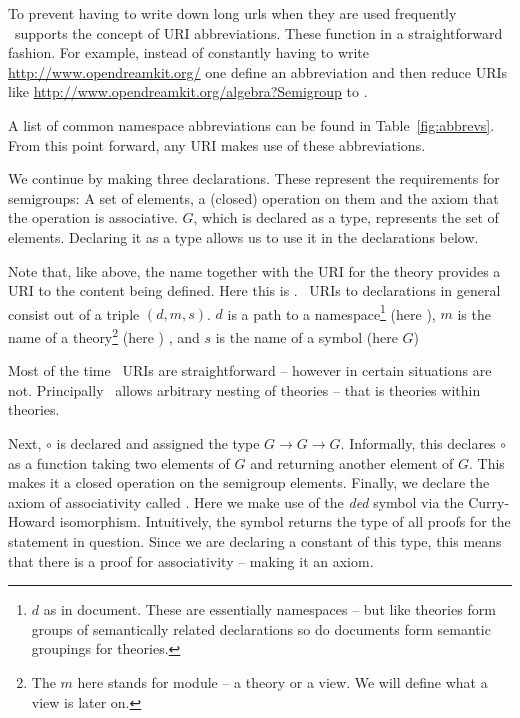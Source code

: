 To prevent having to write down long urls when they are used frequently \mmt\ supports the concept of URI abbreviations. 
These function in a straightforward fashion. 
For example, instead of constantly having to write \url{http://www.opendreamkit.org/} one define an abbreviation  and then reduce URIs like \url{http://www.opendreamkit.org/algebra?Semigroup} to . 


A list of common namespace abbreviations can be found in Table~\ref{fig:abbrevs}. 
From this point forward, any URI makes use of these abbreviations. 

We continue by making three declarations.
These represent the requirements for semigroups: A set of elements, a (closed) operation on them and the axiom that the operation is associative.
$G$, which is declared as a type, represents the set of elements.
Declaring it as a type allows us to use it in the declarations below.

Note that, like above, the name together with the URI for the theory provides a URI to the content being defined.
Here this is .
\mmt\ URIs to declarations in general consist out of a triple $(d, m, s)$. 
$d$ is a path to a namespace\footnote{
  $d$ as in document.
  These are essentially namespaces -- but like theories form groups of semantically related declarations so do documents form semantic groupings for theories.
} (here ), 
$m$ is the name of a theory\footnote{
  The $m$ here stands for module -- a theory or a view.
  We will define what a view is later on.
} (here ) , 
and $s$ is the name of a symbol (here $G$)

Most of the time \mmt\ URIs are straightforward -- however in certain situations are not.
Principally \mmt\ allows arbitrary nesting of theories -- that is theories within theories.

Next, $\circ$ is declared and assigned the type $G \rightarrow G \rightarrow G$.
Informally, this declares $\circ$ as a function taking two elements of $G$ and returning another element of $G$. 
This makes it a closed operation on the semigroup elements.
Finally, we declare the axiom of associativity called .
Here we make use of the \textit{ded} symbol via the Curry-Howard isomorphism\cite{Howard:tfnoc80}.
Intuitively, the symbol returns the type of all proofs for the statement in question.
Since we are declaring a constant of this type, this means that there is a proof for associativity -- making it an axiom.

